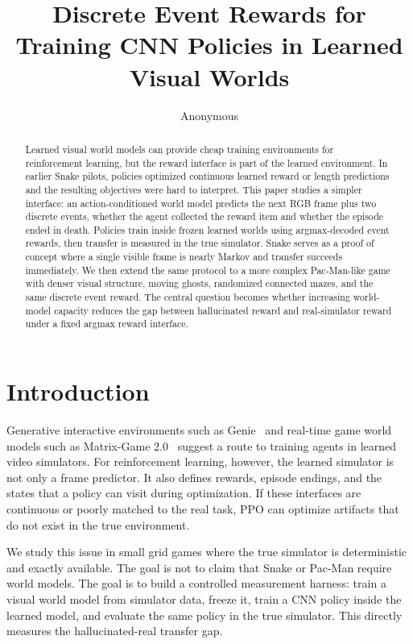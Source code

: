 \documentclass[11pt]{article}
\title{Discrete Event Rewards for Training CNN Policies in Learned Visual Worlds}
\author{Anonymous}
\date{}
\begin{document}
\maketitle

\begin{abstract}
Learned visual world models can provide cheap training environments for reinforcement learning, but the reward interface is part of the learned environment.
In earlier Snake pilots, policies optimized continuous learned reward or length predictions and the resulting objectives were hard to interpret.
This paper studies a simpler interface: an action-conditioned world model predicts the next RGB frame plus two discrete events, whether the agent collected the reward item and whether the episode ended in death.
Policies train inside frozen learned worlds using argmax-decoded event rewards, then transfer is measured in the true simulator.
Snake serves as a proof of concept where a single visible frame is nearly Markov and transfer succeeds immediately.
We then extend the same protocol to a more complex Pac-Man-like game with denser visual structure, moving ghosts, randomized connected mazes, and the same discrete event reward.
The central question becomes whether increasing world-model capacity reduces the gap between hallucinated reward and real-simulator reward under a fixed argmax reward interface.
\end{abstract}

\section{Introduction}
Generative interactive environments such as Genie~\cite{bruce2024genie} and real-time game world models such as Matrix-Game 2.0~\cite{he2025matrixgame2} suggest a route to training agents in learned video simulators.
For reinforcement learning, however, the learned simulator is not only a frame predictor.
It also defines rewards, episode endings, and the states that a policy can visit during optimization.
If these interfaces are continuous or poorly matched to the real task, PPO can optimize artifacts that do not exist in the true environment.

We study this issue in small grid games where the true simulator is deterministic and exactly available.
The goal is not to claim that Snake or Pac-Man require world models.
The goal is to build a controlled measurement harness: train a visual world model from simulator data, freeze it, train a CNN policy inside the learned model, and evaluate the same policy in the true simulator.
This directly measures the hallucinated-real transfer gap.
\end{document}
